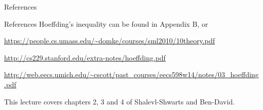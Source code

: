 \documentclass[10pt, table, dvipsnames,handout]{beamer}
\begin{document}
\begin{frame}[fragile]{References}

References Hoeffding's inequality can be found in Appendix B, or 

\url{https://people.cs.umass.edu/~domke/courses/sml2010/10theory.pdf}

\url{http://cs229.stanford.edu/extra-notes/hoeffding.pdf}

\url{http://web.eecs.umich.edu/~cscott/past_courses/eecs598w14/notes/03_hoeffding.pdf}

This lecture covers chapters 2, 3 and 4 of Shalevl-Shwarts and Ben-David.
\end{frame}
\end{document}
